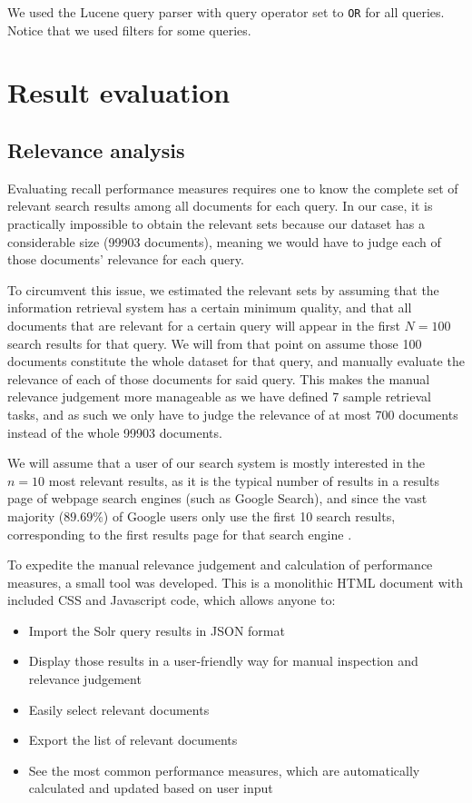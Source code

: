 \documentclass[sigconf, authorversion]{acmart}
\begin{document}
We used the Lucene query parser with query operator set to \texttt{OR} for all queries. Notice that we used filters for some queries.

\section{Result evaluation} \label{sec:evaluation}

\subsection{Relevance analysis} \label{sec:relevance-analysis}

Evaluating recall performance measures requires one to know the complete set of relevant search results among all documents for each query. In our case, it is practically impossible to obtain the relevant sets because our dataset has a considerable size (\SI{99903}{} documents), meaning we would have to judge each of those documents' relevance for each query.

To circumvent this issue, we estimated the relevant sets by assuming that the information retrieval system has a certain minimum quality, and that all documents that are relevant for a certain query will appear in the first $N = 100$ search results for that query. We will from that point on assume those \SI{100}{} documents constitute the whole dataset for that query, and manually evaluate the relevance of each of those documents for said query. This makes the manual relevance judgement more manageable as we have defined 7 sample retrieval tasks, and as such we only have to judge the relevance of at most 700 documents instead of the whole \SI{99903}{} documents.

We will assume that a user of our search system is mostly interested in the $n=10$ most relevant results, as it is the typical number of results in a results page of webpage search engines (such as Google Search), and since the vast majority ($89.69\%$) of Google users only use the first 10 search results, corresponding to the first results page for that search engine \cite{seo-hacker}.

To expedite the manual relevance judgement and calculation of performance measures, a small tool was developed. This is a monolithic HTML document with included CSS and Javascript code, which allows anyone to:
\begin{itemize}
    \item Import the Solr query results in JSON format
    \item Display those results in a user-friendly way for manual inspection and relevance judgement
    \item Easily select relevant documents
    \item Export the list of relevant documents
    \item See the most common performance measures, which are automatically calculated and updated based on user input
\end{itemize}
\end{document}
